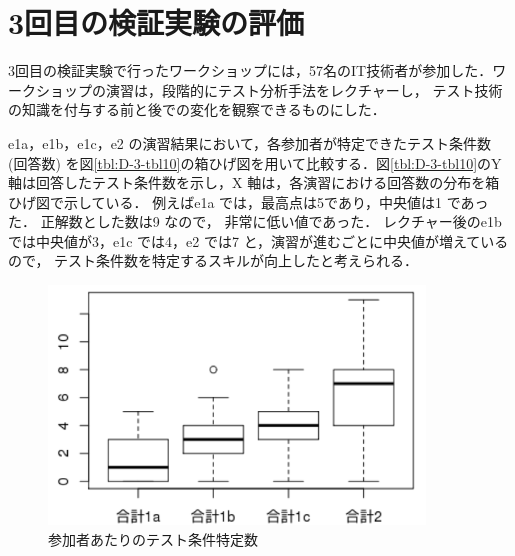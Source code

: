 \documentclass[a4paper,12pt]{jreport}
\begin{document}
\section{3回目の検証実験の評価}
3回目の検証実験で行ったワークショップには，57名のIT技術者が参加した．ワークショップの演習は，段階的にテスト分析手法をレクチャーし， テスト技術の知識を付与する前と後での変化を観察できるものにした．

 e1a，e1b，e1c，e2 の演習結果において，各参加者が特定できたテスト条件数 (回答数) を図\ref{tbl:D-3-tbl10}の箱ひげ図を用いて比較する．図\ref{tbl:D-3-tbl10}のY 軸は回答したテスト条件数を示し，X 軸は，各演習における回答数の分布を箱ひげ図で示している． 例えばe1a では，最高点は5であり，中央値は1 であった． 正解数とした数は9 なので， 非常に低い値であった． レクチャー後のe1bでは中央値が3，e1c では4，e2 では7 と，演習が進むごとに中央値が増えているので， テスト条件数を特定するスキルが向上したと考えられる．


\begin{figure}[h]
  \begin{center}
  \includegraphics[width=10cm]{./image/D-3-Fig10.png}
  \caption{参加者あたりのテスト条件特定数}
  \label{fig:D-3-Fig10}
  \end{center}
   \end{figure}
\end{document}
